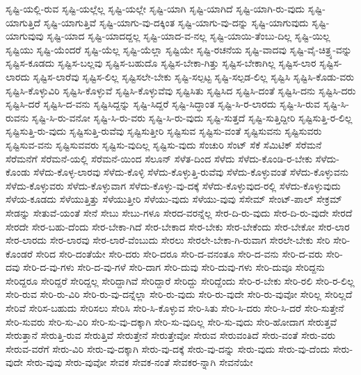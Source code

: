 {ಸೃಷ್ಟಿ-ಯಲ್ಲಿ-ರುವ
ಸೃಷ್ಟಿ-ಯಲ್ಲೆಲ್ಲ
ಸೃಷ್ಟಿ-ಯಲ್ಲೇ
ಸೃಷ್ಟಿ-ಯಾಗಿ
ಸೃಷ್ಟಿ-ಯಾಗಿದೆ
ಸೃಷ್ಟಿ-ಯಾಗಿ-ರು-ವುದು
ಸೃಷ್ಟಿ-ಯಾಗುತ್ತಿದೆ
ಸೃಷ್ಟಿ-ಯಾಗುತ್ತಿವೆ
ಸೃಷ್ಟಿ-ಯಾಗು-ವು-ದಕ್ಕಿಂತ
ಸೃಷ್ಟಿ-ಯಾಗು-ವು-ದನ್ನು
ಸೃಷ್ಟಿ-ಯಾಗುವುದು
ಸೃಷ್ಟಿ-ಯಾಗುವುವು
ಸೃಷ್ಟಿ-ಯಾದ
ಸೃಷ್ಟಿ-ಯಾದದ್ದಲ್ಲ
ಸೃಷ್ಟಿ-ಯಾದ-ವ-ನಲ್ಲ
ಸೃಷ್ಟಿ-ಯಾಯಿ-ತೆಂಬು-ದಿಲ್ಲ
ಸೃಷ್ಟಿ-ಯಿಲ್ಲ
ಸೃಷ್ಟಿಯು
ಸೃಷ್ಟಿ-ಯೆಂದರೆ
ಸೃಷ್ಟಿ-ಯೆಲ್ಲ
ಸೃಷ್ಟಿ-ಯೆಲ್ಲಾ
ಸೃಷ್ಟಿಯೇ
ಸೃಷ್ಟಿ-ರಚನೆಯ
ಸೃಷ್ಟಿ-ವಾದವು
ಸೃಷ್ಟಿ-ವೈ-ಚಿತ್ರ್ಯ-ವನ್ನು
ಸೃಷ್ಟಿಸ-ಕೂಡದು
ಸೃಷ್ಟಿಸ-ಬಲ್ಲವು
ಸೃಷ್ಟಿಸ-ಬಹುದೊ
ಸೃಷ್ಟಿಸ-ಬೇಕಾ-ಗಿತ್ತು
ಸೃಷ್ಟಿಸ-ಬೇಕಾಗಿಲ್ಲ
ಸೃಷ್ಟಿಸ-ಲಾರ
ಸೃಷ್ಟಿಸ-ಲಾರದು
ಸೃಷ್ಟಿಸ-ಲಾರೆವು
ಸೃಷ್ಟಿಸ-ಲಿಲ್ಲ
ಸೃಷ್ಟಿಸಲೇ-ಬೇಕು
ಸೃಷ್ಟಿ-ಸಲ್ಪಟ್ಟ
ಸೃಷ್ಟಿ-ಸಲ್ಪಡ-ಲಿಲ್ಲ
ಸೃಷ್ಟಿಸಿ
ಸೃಷ್ಟಿಸಿ-ಕೊಡು-ವರು
ಸೃಷ್ಟಿಸಿ-ಕೊಳ್ಳುವಿರಿ
ಸೃಷ್ಟಿಸಿ-ಕೊಳ್ಳುವೆ
ಸೃಷ್ಟಿಸಿ-ಕೊಳ್ಳುವೆವು
ಸೃಷ್ಟಿಸಿತು
ಸೃಷ್ಟಿಸಿದ
ಸೃಷ್ಟಿಸಿ-ದಂತೆ
ಸೃಷ್ಟಿಸಿ-ದನು
ಸೃಷ್ಟಿಸಿ-ದರು
ಸೃಷ್ಟಿಸಿ-ದರೆ
ಸೃಷ್ಟಿಸಿ-ದ-ವನು
ಸೃಷ್ಟಿಸಿದ್ದನ್ನು
ಸೃಷ್ಟಿ-ಸಿದ್ದರೆ
ಸೃಷ್ಟಿ-ಸಿದ್ಧಾಂತ
ಸೃಷ್ಟಿ-ಸಿ-ರ-ಲಾರದು
ಸೃಷ್ಟಿ-ಸಿ-ರುವ
ಸೃಷ್ಟಿ-ಸಿ-ರುವನು
ಸೃಷ್ಟಿ-ಸಿ-ರು-ವನೋ
ಸೃಷ್ಟಿ-ಸಿ-ರು-ವರು
ಸೃಷ್ಟಿ-ಸಿ-ರು-ವುದು
ಸೃಷ್ಟಿ-ಸುತ್ತದೆ
ಸೃಷ್ಟಿ-ಸುತ್ತಿದ್ದೀರಿ
ಸೃಷ್ಟಿಸುತ್ತಿ-ರ-ಲಿಲ್ಲ
ಸೃಷ್ಟಿಸುತ್ತಿ-ರು-ವುದು
ಸೃಷ್ಟಿಸುತ್ತಿ-ರುವೆವು
ಸೃಷ್ಟಿಸುತ್ತೀರಿ
ಸೃಷ್ಟಿಸುವ
ಸೃಷ್ಟಿಸು-ವಂತೆ
ಸೃಷ್ಟಿಸುವನು
ಸೃಷ್ಟಿಸುವರು
ಸೃಷ್ಟಿಸುವ-ವನು
ಸೃಷ್ಟಿಸುವವರು
ಸೃಷ್ಟಿಸು-ವುದಿಲ್ಲ
ಸೃಷ್ಟಿಸು-ವುದು
ಸೆಂಚುರಿ
ಸೆಂಟ್
ಸೆಕೆ
ಸೆಮಿಟಿಕ್
ಸೆರೆಮನೆ
ಸೆರೆಮನೆಗೆ
ಸೆರೆಮನೆ-ಯಲ್ಲಿ
ಸೆರೆಮನೆ-ಯಿಂದ
ಸೆಲೂನ್
ಸೆಳೆತ-ದಿಂದ
ಸೆಳೆದು
ಸೆಳೆದು-ಕೊಂಡಿ-ರ-ಬೇಕು
ಸೆಳೆದು-ಕೊಂಡು
ಸೆಳೆದು-ಕೊಳ್ಳ-ಲಾರವು
ಸೆಳೆದು-ಕೊಳ್ಳಿ
ಸೆಳೆದು-ಕೊಳ್ಳುತ್ತಿ-ರುವೆವು
ಸೆಳೆದು-ಕೊಳ್ಳುವಂತೆ
ಸೆಳೆದು-ಕೊಳ್ಳುವನು
ಸೆಳೆದು-ಕೊಳ್ಳುವರು
ಸೆಳೆದು-ಕೊಳ್ಳುವಾಗ
ಸೆಳೆದು-ಕೊಳ್ಳು-ವು-ದಕ್ಕೆ
ಸೆಳೆದು-ಕೊಳ್ಳುವುದ-ರಲ್ಲಿ
ಸೆಳೆದು-ಕೊಳ್ಳುವುದು
ಸೆಳೆಯ-ಕೂಡದು
ಸೆಳೆಯುತ್ತಿತ್ತು
ಸೆಳೆಯುತ್ತೀರಿ
ಸೆಳೆಯು-ವುದು
ಸೆಳೆಯು-ವುವು
ಸೆಸೇಮ್
ಸೇಂಟ್-ಪಾಲ್
ಸೇಕ್ರಮ್
ಸೇಡನ್ನು
ಸೇತುವೆ-ಯಂತೆ
ಸೇನೆ
ಸೇಬು
ಸೇಬು-ಗಳೂ
ಸೇರದ-ವರನ್ನೆಲ್ಲ
ಸೇರ-ದಿ-ರು-ವುದು
ಸೇರ-ದಿ-ರು-ವುದೇ
ಸೇರದೆ
ಸೇರದೇ
ಸೇರ-ಬಹು-ದೆಂದು
ಸೇರ-ಬೇಕಾ-ಗಿದೆ
ಸೇರ-ಬೇಕಾದ
ಸೇರ-ಬೇಕು
ಸೇರ-ಬೇಕೆಂದು
ಸೇರ-ಬೇಕೋ
ಸೇರ-ಲಾರ
ಸೇರ-ಲಾರದು
ಸೇರ-ಲಾರವು
ಸೇರ-ಲಾರೆ-ವೆಂಬುದು
ಸೇರಲು
ಸೇರಲೇ-ಬೇಕಾ-ಗಿ-ರುವಾಗ
ಸೇರಲೇ-ಬೇಕು
ಸೇರಿ
ಸೇರಿ-ಕೊಂಡರೆ
ಸೇರಿದ
ಸೇರಿ-ದಂತೆಯೇ
ಸೇರಿ-ದರು
ಸೇರಿ-ದರೂ
ಸೇರಿ-ದ-ವನಂತೂ
ಸೇರಿ-ದ-ವನು
ಸೇರಿ-ದ-ವರು
ಸೇರಿ-ದವು
ಸೇರಿ-ದ-ವು-ಗಳು
ಸೇರಿ-ದ-ವು-ಗಳೆ
ಸೇರಿ-ದಾಗ
ಸೇರಿ-ದುವು
ಸೇರಿ-ದುವು-ಗಳು
ಸೇರಿ-ದುವೂ
ಸೇರಿದ್ದನು
ಸೇರಿದ್ದರೂ
ಸೇರಿದ್ದರೆ
ಸೇರಿದ್ದಲ್ಲ
ಸೇರಿದ್ದಾಗಿವೆ
ಸೇರಿದ್ದಾರೆ
ಸೇರಿದ್ದು
ಸೇರಿದ್ದೆಂದು
ಸೇರಿ-ರ-ಬೇಕು
ಸೇರಿ-ರಲಿ
ಸೇರಿ-ರ-ಲಿಲ್ಲ
ಸೇರಿ-ರುವ
ಸೇರಿ-ರು-ವಿರಿ
ಸೇರಿ-ರು-ವು-ದನ್ನೆಲ್ಲಾ
ಸೇರಿ-ರು-ವುದು
ಸೇರಿ-ರು-ವುದೇ
ಸೇರಿ-ರು-ವುವೋ
ಸೇರಿಲ್ಲ
ಸೇರಿಲ್ಲದೆ
ಸೇರಿವೆ
ಸೇರಿಸ-ಬಹುದು
ಸೇರಿಸಲು
ಸೇರಿಸಿ
ಸೇರಿ-ಸಿ-ಕೊಳ್ಳುವ
ಸೇರಿ-ಸಿತು
ಸೇರಿ-ಸಿ-ದರು
ಸೇರಿ-ಸಿ-ದರೆ
ಸೇರಿ-ಸುತ್ತೇನೆ
ಸೇರಿ-ಸುವರು
ಸೇರಿ-ಸು-ವಿರಿ
ಸೇರಿ-ಸು-ವು-ದಕ್ಕಾಗಿ
ಸೇರಿ-ಸು-ವುದಿಲ್ಲ
ಸೇರಿ-ಸು-ವುದು
ಸೇರಿ-ಹೋದಾಗ
ಸೇರುತ್ತವೆ
ಸೇರುತ್ತಾನೆ
ಸೇರುತ್ತಿ-ರುವ
ಸೇರುತ್ತಿವೆ
ಸೇರುತ್ತೇನೆ
ಸೇರುತ್ತೇವೋ
ಸೇರುವ
ಸೇರುವಂತಿದೆ
ಸೇರು-ವಂತೆ
ಸೇರು-ವರು
ಸೇರುವ-ವರೆಗೆ
ಸೇರು-ವಿರಿ
ಸೇರು-ವು-ದಕ್ಕಾಗಿ
ಸೇರು-ವು-ದಕ್ಕೆ
ಸೇರು-ವು-ದನ್ನು
ಸೇರು-ವುದು
ಸೇರು-ವು-ದೆಂದು
ಸೇರು-ವುದೇ
ಸೇರು-ವುವು
ಸೇರು-ವುವೋ
ಸೇವಕ
ಸೇವಕ-ನಂತೆ
ಸೇವಕರ-ನ್ನಾಗಿ
ಸೇವನೆಯೇ
}
